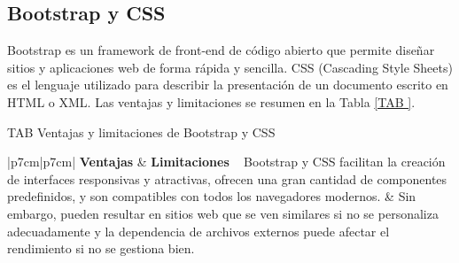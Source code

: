\subsection{Bootstrap y CSS}

Bootstrap es un framework de front-end de código abierto que permite diseñar sitios y aplicaciones web de forma rápida y sencilla. CSS (Cascading Style Sheets) es el lenguaje utilizado para describir la presentación de un documento escrito en HTML o XML. Las ventajas y limitaciones se resumen en la Tabla \ref{TAB
}.

\begin{table}[Bootstrap y CSS]{TAB
}{Ventajas y limitaciones de Bootstrap y CSS}
\begin{tabular}{|p{7cm}|p{7cm}|}
\hline
\textbf{Ventajas} & \textbf{Limitaciones} \
\hline
Bootstrap y CSS facilitan la creación de interfaces responsivas y atractivas, ofrecen una gran cantidad de componentes predefinidos, y son compatibles con todos los navegadores modernos. & Sin embargo, pueden resultar en sitios web que se ven similares si no se personaliza adecuadamente y la dependencia de archivos externos puede afectar el rendimiento si no se gestiona bien. \
\hline
\end{tabular}
\end{table}